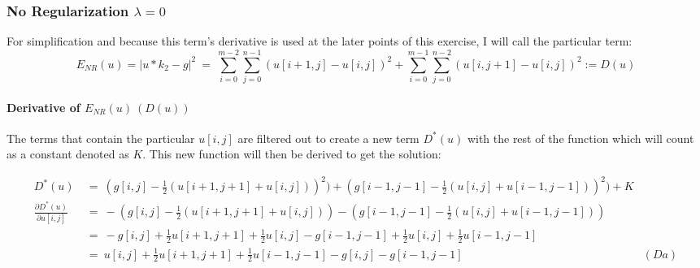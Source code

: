 \documentclass{report}
\begin{document}
			\subsubsection{No Regularization $\lambda = 0$}
			\startsubsection
				For simplification and because this term's derivative is used at the later points of this exercise, I will call the particular term:
				\vspace{-0.4cm}
				\[
					E_{NR}(u) = | u \ast k_2 - g | ^2 \ = \ \sum_{i=0}^{m-2} \sum_{j=0}^{n-1} ( u[i+1,j] - u[i,j] )^2 + \sum_{i=0}^{m-1} \sum_{j=0}^{n-2} ( u[i,j+1] - u[i,j] )^2 := D(u)
				\]
				\vspace{-0.8cm} \paragraph{Derivative of $E_{NR}(u) \ (D(u))$}
				\startsubsection
					The terms that contain the particular $u[i,j]$ are filtered out to create a new term $D^*(u)$ with the rest of the function which will count as a constant denoted as $K$. This new function will then be derived to get the solution:
					\begin{adjustwidth}{-4em}{}
					\vspace{-0.5cm}
						\begin{align*}
							D^*(u) \ & = \ (g[i,j] - \frac{1}{2} (u[i+1,j+1] + u[i,j]))^2) + (g[i-1,j-1] - \frac{1}{2} (u[i,j] + u[i-1,j-1]))^2) + K \\
							\frac{\partial D^*(u)}{\partial u[i,j]} \ & = \ - (g[i,j] - \frac{1}{2} (u[i+1,j+1] + u[i,j])) - (g[i-1,j-1] - \frac{1}{2} (u[i,j] + u[i-1,j-1])) \\
							& = \ - g[i,j] + \frac{1}{2} u[i+1,j+1] + \frac{1}{2} u[i,j] - g[i-1,j-1] + \frac{1}{2} u[i,j] + \frac{1}{2} u[i-1,j-1] \\
							& = \ u[i,j]  + \frac{1}{2} u[i+1,j+1] + \frac{1}{2} u[i-1,j-1] - g[i,j] - g[i-1,j-1] & (Da)
						\end{align*}
					\end{adjustwidth}
				\closesection
			\closesection
\end{document}

